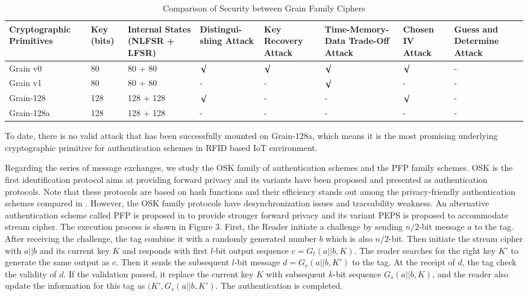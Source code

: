 \documentclass[preprint,10pt,5p]{elsarticle}
\begin{document}
\begin{table}[t]
\centering
\caption{Comparison of Security between Grain Family Ciphers}
\label{Table.4}
\begin{tabular}{ |p{2.4cm}|p{1cm}|p{1.5cm}|p{1.5cm}|p{1.3cm}|p{1.2cm}|p{1.2cm}|p{1.5cm}|  }
 \hline
 Cryptographic Primitives & Key (bits) & Internal States (NLFSR + LFSR) & Distingui-shing Attack & Key Recovery Attack & Time-Memory-Data Trade-Off Attack & Chosen IV Attack & Guess and Determine Attack\\[0.5ex] 
 \hline 
 Grain v0 &  80  & 80 + 80   & $\surd$ & $\surd$ & $\surd$ & $\surd$ & -\\[0.5ex]
 Grain v1 &  80  & 80 + 80   & - & - & $\surd$ & - & -\\[0.5ex]
 Grain-128 & 128 & 128 + 128 & $\surd$ & - & - & $\surd$ & -\\[0.5ex]
 Grain-128a & 128 & 128 + 128 & - & - & - & - & -\\[0.5ex]
 \hline
\end{tabular}
\end{table}

To date, there is no valid attack that has been successfully mounted on Grain-128a, which means it is the most promising underlying cryptographic primitive for authentication schemes in RFID based IoT environment.

Regarding the series of message exchanges, we study the OSK family of authentication schemes and the PFP family schemes. OSK \cite{ohkubo2003} is the first identification protocol aims at providing forward privacy and its variants \cite{ohkubo2004, avoine2005} have been proposed and presented as authentication protocols. Note that these protocols are based on hash functions and their efficiency stands out among the privacy-friendly authentication schemes compared in \cite{avoine2013}. However, the OSK family protocols have desynchronization issues and traceability weakness. An alternative authentication scheme called PFP is proposed in \cite{berbain2009} to provide stronger forward privacy and its variant PEPS \cite{billet2010} is proposed to accommodate stream cipher. The execution process is shown in Figure 3. First, the Reader initiate a challenge by sending $n/2$-bit message $a$ to the tag. After receiving the challenge, the tag combine it with a randomly generated number $b$ which is also $n/2$-bit. Then initiate the stream cipher with $a||b$ and its current key $K$ and responds with first $l$-bit output sequence $c=G_t(a||b,K)$. The reader searches for the right key $K'$ to generate the same output as $c$. Then it sends the subsequent $l$-bit message $d=G_r(a||b,K')$ to the tag. At the receipt of $d$, the tag check the validity of $d$. If the validation passed, it replace the current key $K$ with subsequent $k$-bit sequence $G_s(a||b,K)$, and the reader also update the information for this tag as $(K',G_s(a||b,K')$. The authentication is completed.
\end{document}

